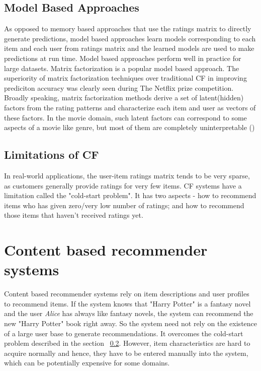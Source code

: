 \subsection {Model Based Approaches}
As opposed to memory based approaches that use the ratings matrix to directly generate predictions, model based approaches learn models corresponding to each item and each user from ratings matrix and the learned models are used to make predictions at run time.
Model based approaches perform well in practice for large datasets.
Matrix factorization is a popular model based approach. The superiority of matrix factorization techniques over traditional CF in improving prediciton accuracy was clearly seen during The Netflix prize competition.
Broadly speaking, matrix factorization methods derive a set of latent(hidden) factors from the rating patterns and characterize each item and user as vectors of these factors.
In the movie domain, such latent factors can correspond to some aspects of a movie like genre, but most of them are completely uninterpretable (\cite{koren})


\subsection{Limitations of CF}
\label{sec:limCF}
In real-world applications, the user-item ratings matrix tends to be very sparse, as customers generally provide ratings for very few items. CF systems have a limitation called the "cold-start problem". It has two aspects - how to recommend items who has given zero/very low number of ratings; and how to recommend those items that haven't received ratings yet.

%

%

\section{Content based recommender systems}
Content based recommender systems rely on item descriptions and user profiles to recommend items.
If the system knows that "Harry Potter" is a fantasy novel and the user \textit{Alice} has always like fantasy novels, the system can recommend the new "Harry Potter" book right away. So the system need not rely on the existence of a large user base to generate recommendations.
It overcomes the cold-start problem described in the section ~\ref{sec:limCF}. However, item characteristics are hard to acquire normally and hence, they have to be entered manually into the system, which can be potentially expensive for some domains.

